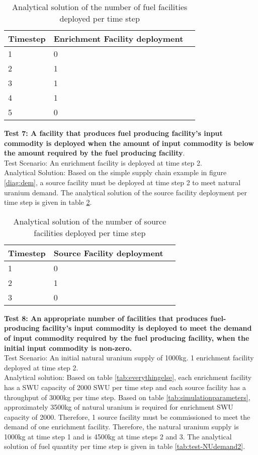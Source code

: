 \documentclass[12pt,letterpaper]{article}
\begin{document}
\begin{table}[H]
     \centering
    \begin{tabularx}{\textwidth}{bbb}
       \hline
       Timestep & Enrichment Facility deployment \\
       \hline
       1 & 0 \\
       2 & 1 \\
       3 & 1 \\
       4 & 1 \\
       5 & 0 \\
       \hline
    \end{tabularx}
    \caption {Analytical solution of the number of fuel facilities deployed per time step}
    \label{tab:test-supplymoredemand}
\end{table}

\noindent
\textbf{Test 7: A facility that produces fuel producing facility's input commodity is deployed when the amount of input commodity is below the amount required by the fuel producing facility}. \\
Test Scenario: An enrichment facility is deployed at time step 2. \\
Analytical Solution: Based on the simple supply chain example in
figure \ref{diag:dem}, a source facility must be deployed at time step 2 to meet natural uranium demand. The analytical solution of the source facility deployment per time step is given in table \ref{tab:test-NUdemand}. 

\begin{table}[H]
     \centering
    \begin{tabularx}{\textwidth}{bbb}
       \hline
       Timestep & Source Facility deployment  \\
       \hline
       1 & 0 \\
       2 & 1 \\
       3 & 0 \\
       \hline
    \end{tabularx}
    \caption {Analytical solution of the number of source facilities deployed per time step}
    \label{tab:test-NUdemand}
\end{table}

\noindent
\textbf{Test 8: An appropriate number of facilities that produces fuel-producing facility's input commodity is deployed to meet the demand of input commodity required by the fuel producing facility, when the initial input commodity is non-zero.} \\
Test Scenario: An initial natural uranium supply of 1000kg. 1 enrichment facility deployed at time step 2. \\
Analytical solution: Based on table \ref{tab:everythingelse}, each enrichment facility has a SWU capacity of 2000 SWU per time step and each source facility has a throughput of 3000kg per time step. Based on table \ref{tab:simulationparameters}, approximately 3500kg of natural uranium is required for enrichment SWU capacity of 2000. Therefore, 1 source facility must be commissioned to meet the demand of one enrichment facility. Therefore, the natural uranium supply is 1000kg at time step 1 and is 4500kg at time steps 2 and 3. The analytical solution of fuel quantity per time step is given in table \ref{tab:test-NUdemand2}.  
\end{document}
